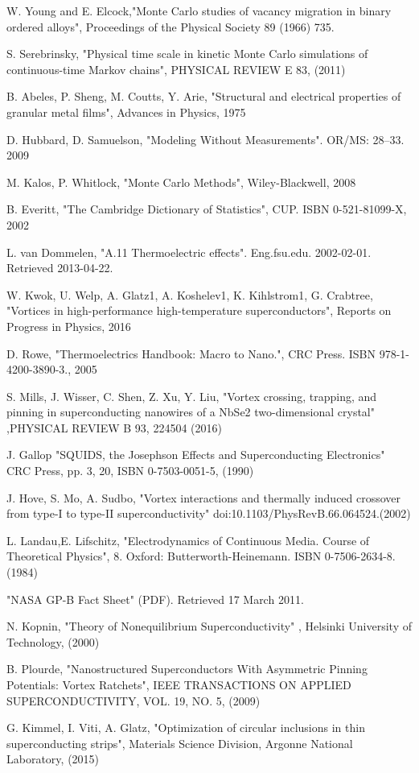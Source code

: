 \begin{thebibliography}{10}
 W. Young and E. Elcock,"Monte Carlo studies of vacancy migration in binary ordered alloys", Proceedings of the Physical Society 89 (1966) 735.

 S. Serebrinsky, "Physical time scale in kinetic Monte Carlo simulations of continuous-time Markov chains", PHYSICAL REVIEW E 83, (2011)

 B. Abeles, P. Sheng, M. Coutts, Y. Arie, "Structural and electrical properties of granular metal films", Advances in Physics, 1975

 D. Hubbard, D. Samuelson, "Modeling Without Measurements". OR/MS: 28–33. 2009

 M. Kalos, P. Whitlock, "Monte Carlo Methods", Wiley-Blackwell, 2008

 B. Everitt, "The Cambridge Dictionary of Statistics", CUP. ISBN 0-521-81099-X, 2002

 L. van Dommelen, "A.11 Thermoelectric effects". Eng.fsu.edu. 2002-02-01. Retrieved 2013-04-22.

 W. Kwok, U. Welp, A. Glatz1, A. Koshelev1, K. Kihlstrom1, G. Crabtree, "Vortices in high-performance high-temperature superconductors", Reports on Progress in Physics, 2016

 D. Rowe, "Thermoelectrics Handbook: Macro to Nano.", CRC Press. ISBN 978-1-4200-3890-3., 2005

 S. Mills, J. Wisser, C. Shen, Z. Xu, Y. Liu, "Vortex crossing, trapping, and pinning in superconducting nanowires of a NbSe2 two-dimensional crystal" ,PHYSICAL REVIEW B 93, 224504 (2016)

 J. Gallop  "SQUIDS, the Josephson Effects and Superconducting Electronics" CRC Press, pp. 3, 20, ISBN 0-7503-0051-5, (1990)

 J. Hove, S. Mo, A. Sudbo, "Vortex interactions and thermally induced crossover from type-I to type-II superconductivity" doi:10.1103/PhysRevB.66.064524.(2002)

 L. Landau,E. Lifschitz, "Electrodynamics of Continuous Media. Course of Theoretical Physics", 8. Oxford: Butterworth-Heinemann. ISBN 0-7506-2634-8.(1984)

 "NASA GP-B Fact Sheet" (PDF). Retrieved 17 March 2011.

 N. Kopnin, "Theory of Nonequilibrium Superconductivity" , Helsinki University of Technology, (2000)

 B. Plourde, "Nanostructured Superconductors With Asymmetric Pinning Potentials: Vortex Ratchets", IEEE TRANSACTIONS ON APPLIED SUPERCONDUCTIVITY, VOL. 19, NO. 5, (2009)

 G. Kimmel, I. Viti, A. Glatz, "Optimization of circular inclusions in thin superconducting strips", Materials Science Division, Argonne National Laboratory, (2015)

\end{thebibliography}
